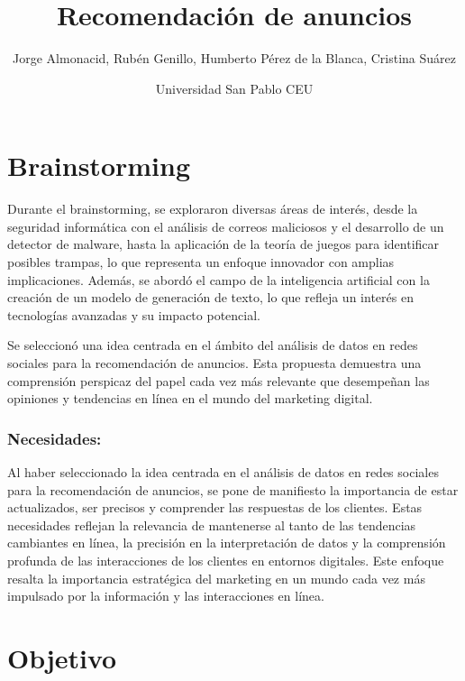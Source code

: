 \documentclass[
]{journal}
\title{Recomendación de anuncios}
\author{Jorge Almonacid, Rubén Genillo, Humberto Pérez de la Blanca,
Cristina Suárez \and Universidad San Pablo CEU}
\date{}
\renewcommand*\contentsname{Tabla de contenidos}
\newcommand\contentsname{Tabla de contenidos}
\begin{document}
\maketitle

\renewcommand*\contentsname{Indice}
{
\hypersetup{linkcolor=}
\setcounter{tocdepth}{3}
\tableofcontents
}
\newpage{}

\section{Brainstorming}\label{brainstorming}

Durante el brainstorming, se exploraron diversas áreas de interés, desde
la seguridad informática con el análisis de correos maliciosos y el
desarrollo de un detector de malware, hasta la aplicación de la teoría
de juegos para identificar posibles trampas, lo que representa un
enfoque innovador con amplias implicaciones. Además, se abordó el campo
de la inteligencia artificial con la creación de un modelo de generación
de texto, lo que refleja un interés en tecnologías avanzadas y su
impacto potencial.

Se seleccionó una idea centrada en el ámbito del análisis de datos en
redes sociales para la recomendación de anuncios. Esta propuesta
demuestra una comprensión perspicaz del papel cada vez más relevante que
desempeñan las opiniones y tendencias en línea en el mundo del marketing
digital.

\subsubsection{Necesidades:}\label{necesidades}

Al haber seleccionado la idea centrada en el análisis de datos en redes
sociales para la recomendación de anuncios, se pone de manifiesto la
importancia de estar actualizados, ser precisos y comprender las
respuestas de los clientes. Estas necesidades reflejan la relevancia de
mantenerse al tanto de las tendencias cambiantes en línea, la precisión
en la interpretación de datos y la comprensión profunda de las
interacciones de los clientes en entornos digitales. Este enfoque
resalta la importancia estratégica del marketing en un mundo cada vez
más impulsado por la información y las interacciones en línea.

\section{Objetivo}\label{objetivo}
\end{document}
